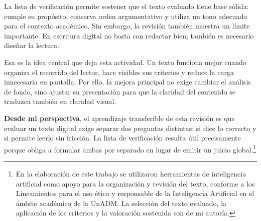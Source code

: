 \documentclass[
	spanish,
	letterpaper, oneside
]{article}
\begin{document}
La lista de verificación permite sostener que el texto evaluado tiene base sólida: cumple su propósito, conserva orden argumentativo y utiliza un tono adecuado para el contexto académico. Sin embargo, la revisión también muestra un límite importante. En escritura digital no basta con redactar bien; también es necesario diseñar la lectura.

Esa es la idea central que deja esta actividad. Un texto funciona mejor cuando organiza el recorrido del lector, hace visibles sus criterios y reduce la carga innecesaria en pantalla. Por ello, la mejora principal no exige cambiar el análisis de fondo, sino ajustar su presentación para que la claridad del contenido se traduzca también en claridad visual.

\textbf{Desde mi perspectiva}, el aprendizaje transferible de esta revisión es que evaluar un texto digital exige separar dos preguntas distintas: si dice lo correcto y si permite leerlo sin fricción. La lista de verificación resulta útil precisamente porque obliga a formular ambas por separado en lugar de emitir un juicio global.\footnote{En la elaboración de este trabajo se utilizaron herramientas de inteligencia artificial como apoyo para la organización y revisión del texto, conforme a los Lineamientos para el uso ético y responsable de la Inteligencia Artificial en el ámbito académico de la UnADM. La selección del texto evaluado, la aplicación de los criterios y la valoración sostenida son de mi autoría.}


\end{document}
